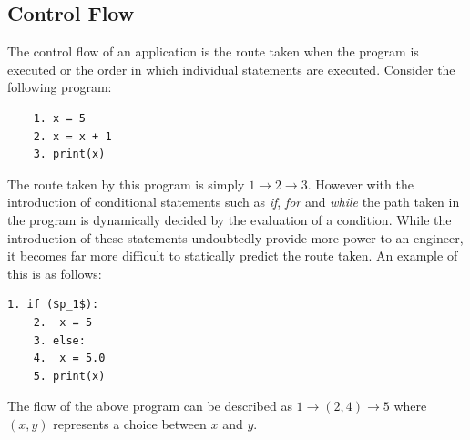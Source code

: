 \documentclass[12pt, titlepage]{article}
\begin{document}
\subsection{Control Flow}
The control flow of an application is the route taken when the program is executed or the order in which individual statements are executed. Consider the following program:
\begin{lstlisting}
	1. x = 5
	2. x = x + 1
	3. print(x)
\end{lstlisting}
The route taken by this program is simply $1 \rightarrow 2 \rightarrow 3$. However with the introduction of conditional statements such as \textit{if}, \textit{for} and \textit{while} the path taken in the program is dynamically decided by the evaluation of a condition. While the introduction of these statements undoubtedly provide more power to an engineer, it becomes far more difficult to statically predict the route taken. An example of this is as follows:
\begin{lstlisting}[mathescape]
	1. if ($p_1$):
	2. 	x = 5
	3. else:
	4. 	x = 5.0
	5. print(x)
\end{lstlisting}
The flow of the above program can be described as $1 \rightarrow (2, 4) \rightarrow 5$ where $(x, y)$ represents a choice between $x$ and $y$.
\end{document}
